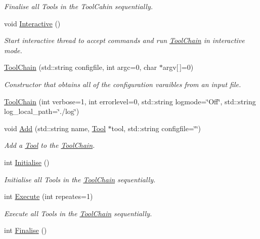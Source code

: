\begin{DoxyCompactItemize}
\begin{DoxyCompactList}\small\item\em Finalise all Tools in the Tool\-Cahin sequentially. \end{DoxyCompactList}\item 
\hypertarget{classToolChain_a9bb47b83b6b85c3b0fab75af0cda19bf}{void \hyperlink{classToolChain_a9bb47b83b6b85c3b0fab75af0cda19bf}{Interactive} ()}\label{classToolChain_a9bb47b83b6b85c3b0fab75af0cda19bf}

\begin{DoxyCompactList}\small\item\em Start interactive thread to accept commands and run \hyperlink{classToolChain}{Tool\-Chain} in interactive mode. \end{DoxyCompactList}\item 
\hyperlink{classToolChain_a133e224899a743ee4a679396f8569bf9}{Tool\-Chain} (std\-::string configfile, int argc=0, char $\ast$argv\mbox{[}$\,$\mbox{]}=0)
\begin{DoxyCompactList}\small\item\em Constructor that obtains all of the configuration varaibles from an input file. \end{DoxyCompactList}\item 
\hyperlink{classToolChain_a04186696e28e3193b2fc756a89d14882}{Tool\-Chain} (int verbose=1, int errorlevel=0, std\-::string logmode=\char`\"{}Off\char`\"{}, std\-::string log\-\_\-local\-\_\-path=\char`\"{}./log\char`\"{})
\item 
void \hyperlink{classToolChain_a4da0c02154a0597704e58836d6607e61}{Add} (std\-::string name, \hyperlink{classTool}{Tool} $\ast$tool, std\-::string configfile=\char`\"{}\char`\"{})
\begin{DoxyCompactList}\small\item\em Add a \hyperlink{classTool}{Tool} to the \hyperlink{classToolChain}{Tool\-Chain}. \end{DoxyCompactList}\item 
\hypertarget{classToolChain_a341f343926341b82a29c586a7b9683af}{int \hyperlink{classToolChain_a341f343926341b82a29c586a7b9683af}{Initialise} ()}\label{classToolChain_a341f343926341b82a29c586a7b9683af}

\begin{DoxyCompactList}\small\item\em Initialise all Tools in the \hyperlink{classToolChain}{Tool\-Chain} sequentially. \end{DoxyCompactList}\item 
int \hyperlink{classToolChain_a303e299293fd4d3a5e91865e04898e52}{Execute} (int repeates=1)
\begin{DoxyCompactList}\small\item\em Execute all Tools in the \hyperlink{classToolChain}{Tool\-Chain} sequentially. \end{DoxyCompactList}\item 
\hypertarget{classToolChain_a3828756135773fb9ca4b361a47296dd9}{int \hyperlink{classToolChain_a3828756135773fb9ca4b361a47296dd9}{Finalise} ()}\label{classToolChain_a3828756135773fb9ca4b361a47296dd9}


\end{DoxyCompactItemize}
